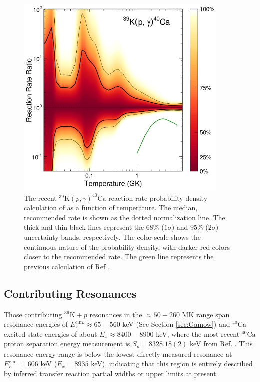 \begin{figure}[t]
\centering
\includegraphics[width=4in]{Chapter-6/figs/39K_p_g_Longland2018.png}
\caption{\label{fig:39K_p_g_Longland}The recent $^{39}\mathrm{K}(p,\gamma)^{40}\mathrm{Ca}$ reaction rate probability density calculation of \cite{Longland2018} as a function of temperature. The median, recommended rate is shown as the dotted normalization line. The thick and thin black lines represent the $68\%$ ($1\sigma$) and $95\%$ ($2\sigma$) uncertainty bands, respectively. The color scale shows the continuous nature of the probability density, with darker red colors closer to the recommended rate. The green line represents the previous calculation of Ref \cite{Cheng1981}.}
\end{figure}

\subsection{Contributing Resonances}

Those contributing $^{39}\mathrm{K}+p$ resonances in the $\approx50-260$ MK range span resonance energies of $E^{\mathrm{c.m.}}_{r} \approx 65-560$ keV (See Section \ref{sec:Gamow}) and $^{40}$Ca excited state energies of about $E_{x} \approx 8400-8900$ keV, where the most recent $^{40}\mathrm{Ca}$ proton separation energy measurement is $S_{p} = 8328.18(2)$ keV from Ref. \cite{Wang2021}. This resonance energy range is below the lowest directly measured resonance at $E^{\mathrm{c.m.}}_{r} = 606$ keV ($E_{x} = 8935$ keV), indicating that this region is entirely described by inferred transfer reaction partial widths or upper limits at present.

